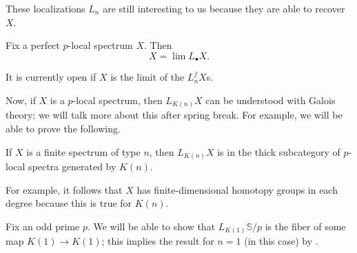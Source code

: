 \documentclass[../notes.tex]{subfiles}
\begin{document}
These localizations $L_n$ are still interesting to us because they are able to recover $X$.
\begin{theorem} \label{thm:recover-x-from-localizations}
	Fix a perfect $p$-local spectrum $X$. Then
	\[X=\lim L_\bullet X.\]
\end{theorem}
\begin{remark}
	It is currently open if $X$ is the limit of the $L_n^fX$s.
\end{remark}
Now, if $X$ is a $p$-local spectrum, then $L_{K(n)}X$ can be understood with Galois theory; we will talk more about this after spring break. For example, we will be able to prove the following.
\begin{theorem} \label{thm:galois-theory}
	If $X$ is a finite spectrum of type $n$, then $L_{K(n)}X$ is in the thick subcategory of $p$-local spectra generated by $K(n)$.
\end{theorem}
\begin{remark}
	For example, it follows that $X$ has finite-dimensional homotopy groups in each degree because this is true for $K(n)$.
\end{remark}
\begin{example}
	Fix an odd prime $p$. We will be able to show that $L_{K(1)}\mathbb S/p$ is the fiber of some map $K(1)\to K(1)$; this implies the result for $n=1$ (in this case) by .
\end{example}
\end{document}
